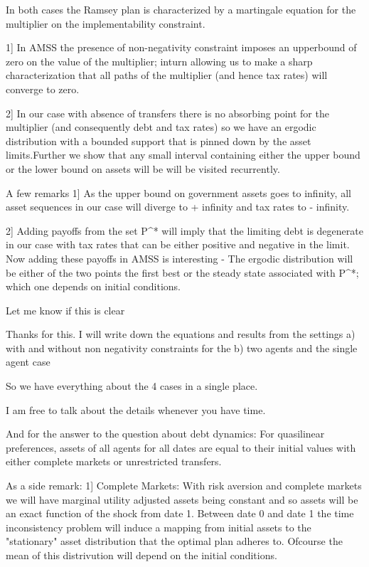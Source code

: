 In both cases the Ramsey plan is characterized by a martingale equation for the multiplier on the implementability constraint.

1] In AMSS the presence of non-negativity constraint imposes an upperbound of zero on the value of the multiplier; inturn allowing us to make a sharp characterization that  all paths of the multiplier (and hence tax rates) will converge to zero.

2] In our case with absence of transfers there is no absorbing point for the multiplier (and consequently debt and tax rates) so we have an ergodic distribution with a bounded support that is pinned down by the asset limits.Further we show that any small interval containing either the upper bound or the lower bound on assets will be will be visited recurrently.

A few remarks
 1] As the upper bound on government assets goes to infinity, all asset sequences in our case will diverge to + infinity and tax rates to - infinity.

2] Adding payoffs from the set P^* will imply that the limiting debt is degenerate in our case with tax rates that can be either positive and negative in the limit. Now adding these payoffs in AMSS is interesting - The ergodic distribution will be either of the  two points the first best or the steady state associated with P^*; which one depends on initial conditions.

Let me know if this is clear 




Thanks for this. I will write down the equations and results from the settings a) with and without non negativity constraints for the b) two agents and the single agent case

So we have everything about the 4 cases in a single place.

I am free to talk about the details whenever you have time.

And for the answer to the question about debt dynamics: For quasilinear preferences, assets of all agents for all dates are equal to their initial values with either complete markets or unrestricted transfers.

As a side remark:
1] Complete Markets: With risk aversion and complete markets we will have marginal utility adjusted assets being constant and so assets will be an exact function of the shock from date 1. Between date 0 and date 1 the time inconsistency problem will induce a mapping from initial assets to the "stationary" asset distribution that the optimal plan adheres to. Ofcourse the mean of this distrivution will depend on the initial conditions.

